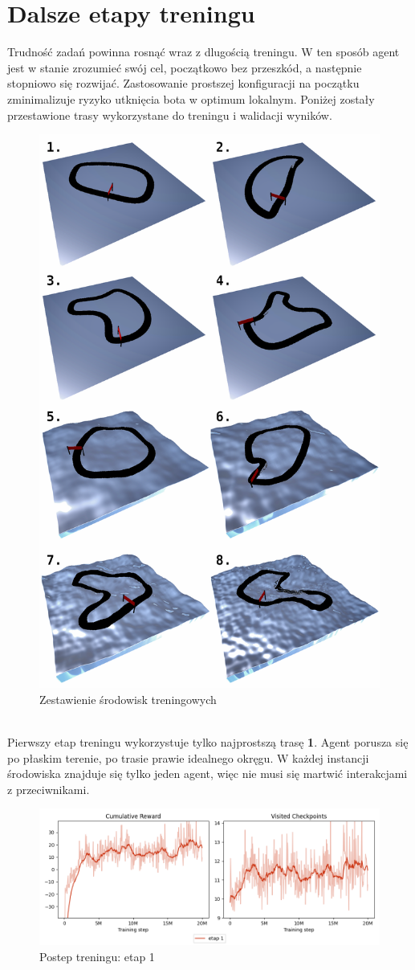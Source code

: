 \section{Dalsze etapy treningu}
Trudność zadań powinna rosnąć wraz z dlugością treningu. W ten sposób agent jest w stanie zrozumieć swój cel, początkowo bez przeszkód, a następnie stopniowo się rozwijać. Zastosowanie prostszej konfiguracji na początku zminimalizuje ryzyko utknięcia bota w optimum lokalnym. Poniżej zostały przestawione trasy wykorzystane do treningu i walidacji wyników.
\begin{figure}[H]
    \centering
    \includegraphics[width=.7\textwidth]{figures/trening_environs.png}
    \caption{Zestawienie środowisk treningowych}
    \label{fig}
\end{figure}
\phantom{.}\\
Pierwszy etap treningu wykorzystuje tylko najprostszą trasę \textbf{1}. Agent porusza się po płaskim terenie, po trasie prawie idealnego okręgu. W każdej instancji środowiska znajduje się tylko jeden agent, więc nie musi się martwić interakcjami z przeciwnikami.
\begin{figure}[H]
    \centering
    \includegraphics[width=\textwidth]{graphs/training_progress_1.png}
    \caption{Postep treningu: etap 1}
    \label{fig}
\end{figure}
